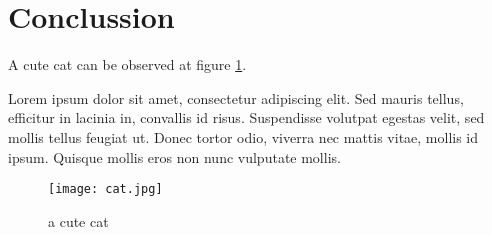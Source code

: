 \section{Conclussion} \label{sec:conclussion}

A cute cat can be observed at figure \ref{fig:cat}.

Lorem ipsum dolor sit amet, consectetur adipiscing elit. Sed mauris tellus, efficitur in lacinia in, convallis id risus. Suspendisse volutpat egestas velit, sed mollis tellus feugiat ut. Donec tortor odio, viverra nec mattis vitae, mollis id ipsum. Quisque mollis eros non nunc vulputate mollis.

\begin{figure}[h]
    \centering
    \texttt{[image: cat.jpg]}
    \caption{a cute cat}
    \label{fig:cat}
\end{figure}
